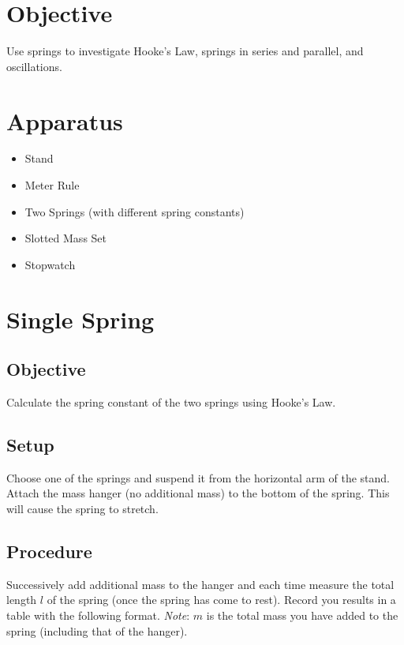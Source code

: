 \section*{Objective}

    Use springs to investigate Hooke's Law, springs in series and parallel, and oscillations.

\section*{Apparatus}

    \begin{itemize}

        \item Stand
        \item Meter Rule
        \item Two Springs (with different spring constants)
        \item Slotted Mass Set
        \item Stopwatch

    \end{itemize}

\setcounter{section}{0}
\section{Single Spring}\label{single_spring}

    \subsection*{Objective}

        Calculate the spring constant of the two springs using Hooke's Law.

    \subsection*{Setup}

        Choose one of the springs and suspend it from the horizontal arm of the stand. Attach the mass hanger (no additional mass) to the bottom of the spring. This will cause the spring to stretch.

        

    \subsection*{Procedure}

        Successively add additional mass to the hanger and each time measure the total length $l$ of the spring (once the spring has come to rest). Record you results in a table with the following format. \textit{Note}: $m$ is the total mass you have added to the spring (including that of the hanger).

